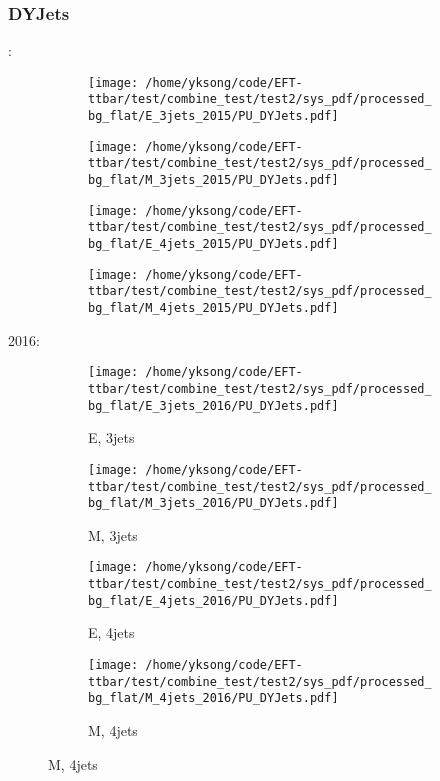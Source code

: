 \documentclass{beamer}
\begin{document}
\begin{frame}
\frametitle{DYJets}
\fontsize{5}{1}:
\begin{figure}
\centering
\begin{subfigure}[b]{0.24\textwidth}
\texttt{[image: /home/yksong/code/EFT-ttbar/test/combine\_test/test2/sys\_pdf/processed\_bg\_flat/E\_3jets\_2015/PU\_DYJets.pdf]}
\end{subfigure}
\begin{subfigure}[b]{0.24\textwidth}
\texttt{[image: /home/yksong/code/EFT-ttbar/test/combine\_test/test2/sys\_pdf/processed\_bg\_flat/M\_3jets\_2015/PU\_DYJets.pdf]}
\end{subfigure}
\begin{subfigure}[b]{0.24\textwidth}
\texttt{[image: /home/yksong/code/EFT-ttbar/test/combine\_test/test2/sys\_pdf/processed\_bg\_flat/E\_4jets\_2015/PU\_DYJets.pdf]}
\end{subfigure}
\begin{subfigure}[b]{0.24\textwidth}
\texttt{[image: /home/yksong/code/EFT-ttbar/test/combine\_test/test2/sys\_pdf/processed\_bg\_flat/M\_4jets\_2015/PU\_DYJets.pdf]}
\end{subfigure}
\end{figure}
2016:
\begin{figure}
\centering
\begin{subfigure}[b]{0.24\textwidth}
\texttt{[image: /home/yksong/code/EFT-ttbar/test/combine\_test/test2/sys\_pdf/processed\_bg\_flat/E\_3jets\_2016/PU\_DYJets.pdf]}
\captionsetup{font=tiny}
\caption{E, 3jets}
\end{subfigure}
\begin{subfigure}[b]{0.24\textwidth}
\texttt{[image: /home/yksong/code/EFT-ttbar/test/combine\_test/test2/sys\_pdf/processed\_bg\_flat/M\_3jets\_2016/PU\_DYJets.pdf]}
\captionsetup{font=tiny}
\caption{M, 3jets}
\end{subfigure}
\begin{subfigure}[b]{0.24\textwidth}
\texttt{[image: /home/yksong/code/EFT-ttbar/test/combine\_test/test2/sys\_pdf/processed\_bg\_flat/E\_4jets\_2016/PU\_DYJets.pdf]}
\captionsetup{font=tiny}
\caption{E, 4jets}
\end{subfigure}
\begin{subfigure}[b]{0.24\textwidth}
\texttt{[image: /home/yksong/code/EFT-ttbar/test/combine\_test/test2/sys\_pdf/processed\_bg\_flat/M\_4jets\_2016/PU\_DYJets.pdf]}
\captionsetup{font=tiny}
\caption{M, 4jets}
\end{subfigure}
\end{figure}
\end{frame}
\end{document}
